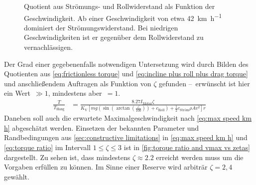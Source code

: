 		\newpage
		\begin{figure}[h]
			\centering
			
			\caption[Quotient aus Strömungs- und Rollwiderstand als Funktion der Geschwindigkeit]{Quotient aus Strömungs- und Rollwiderstand als Funktion der Geschwindigkeit. Ab einer Geschwindigkeit von etwa \qty{42}{\kilo\metre\per\hour} dominiert der Strömungswiderstand. Bei niedrigen Geschwindigkeiten ist er gegenüber dem Rollwiderstand zu vernachlässigen.}%
			\label{fig:Froll vs Fdrag}
		\end{figure}
		Der Grad einer gegebenenfalls notwendigen Untersetzung wird durch Bilden des Quotienten aus \cref{eq:frictionless torque} und \cref{eq:incline plus roll plus drag torque} und anschließendem Auftragen als Funktion von \(\zeta\) gefunden --~erwünscht ist hier ein Wert~\(\gg 1\), mindestens aber~\(= 1\).
		\begin{align}
			\frac{T}{T_\text{Hang}} &= \frac{\num{8,27} I_\text{Motor} \zeta}{K_\text{V}
			\left[ m g
				\left(\sin
					\left(\arctan
						\left(
							\frac{\angle}{100}
						\right)
					\right) + c_\text{Roll}
				\right) + \frac{1}{2} c_\text{Ström} \rho A v^2
			\right] r}%
			\label{eq:torque ratio}
		\end{align}
		Daneben soll auch die erwartete Maximalgeschwindigkeit nach \cref{eq:max speed km h} abgeschätzt werden.
		Einsetzen der bekannten Parameter und Randbedingungen aus \cref{sec:constructive limitations} in \cref{eq:max speed km h} und \cref{eq:torque ratio} im Intervall \(1 \leq \zeta \leq 3\) ist in \cref{fig:torque ratio and vmax vs zetas} dargestellt.
		Zu sehen ist, dass mindestens \(\zeta \approx \num{2,2}\) erreicht werden muss um die Vorgaben erfüllen zu können.
		Im Sinne einer Reserve wird arbiträr \(\zeta = 2,4\) gewählt.
